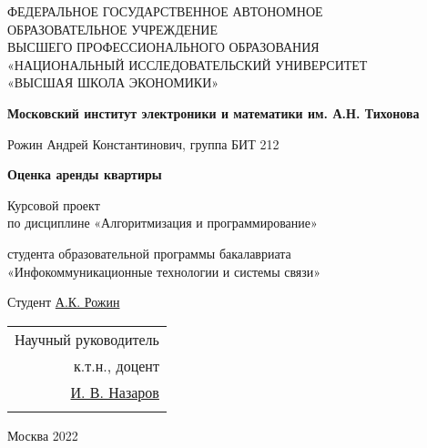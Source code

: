 \documentclass{article}
\date{}
\begin{document}
	\renewcommand{\arraystretch}{1.5}
	
	\large
	\begin{titlepage}
		\begin{center}
			ФЕДЕРАЛЬНОЕ ГОСУДАРСТВЕННОЕ АВТОНОМНОЕ \\ ОБРАЗОВАТЕЛЬНОЕ УЧРЕЖДЕНИЕ \\ ВЫСШЕГО ПРОФЕССИОНАЛЬНОГО ОБРАЗОВАНИЯ \\ «НАЦИОНАЛЬНЫЙ ИССЛЕДОВАТЕЛЬСКИЙ УНИВЕРСИТЕТ \\ «ВЫСШАЯ ШКОЛА ЭКОНОМИКИ»
			
			\vspace{1cm}
			
			\textbf{Московский институт электроники и математики им. А.Н. Тихонова}
			
			\vspace{2cm}
			
			Рожин Андрей Константинович, группа БИТ 212
			
			\vspace{1.5cm}
			
			\textbf{Оценка аренды квартиры}
			
			\vspace{1cm}
			
			Курсовой проект \\
			по дисциплине «Алгоритмизация и программирование»
			
			\vspace{1cm}
			
			студента образовательной программы бакалавриата \\
			«Инфокоммуникационные технологии и системы связи»
		
			\vspace{1cm}
			\begin{flushright}
				Студент \underline{\hspace{5cm}}  \underline{А.К. Рожин}
			\end{flushright}
		
			\vspace{0.5cm}	
			
		\begin{flushright}
				\begin{tabular}{r} 
				 Научный руководитель \\ [-0.35cm]
				 к.т.н., доцент \\ [-0.35cm]
				 \underline{И. В. Назаров} \\
				 \\ \cline{1-1} 
				\end{tabular}
		\end{flushright}
			
			
			\vfill
			
			Москва
			2022
		\end{center}
	\end{titlepage}
\end{document}
